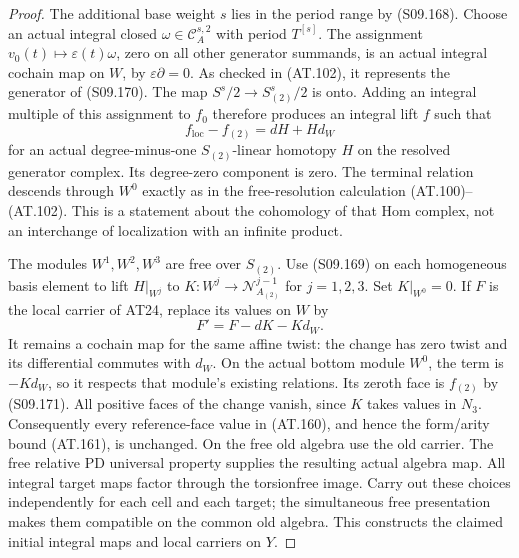 \begin{proof}
The additional base weight $s$ lies in the period range by
(S09.168). Choose an actual integral closed
$\omega\in\mathcal C_A^{s,2}$ with period $T^{[s]}$.
The assignment $v_0(t)\mapsto\varepsilon(t)\omega$, zero
on all other generator summands, is an actual integral
cochain map on $W$, by $\varepsilon\partial=0$.
As checked in (AT.102), it represents the generator of
(S09.170). The map $S^s/2\to S_{(2)}^s/2$ is onto.
Adding an integral multiple of this assignment to $f_0$
therefore produces an integral lift $f$ such that
\[
                 f_{\mathrm{loc}}-f_{(2)}=dH+Hd_W
 \tag{S09.171}
\]
for an actual degree-minus-one $S_{(2)}$-linear homotopy $H$
on the resolved generator complex. Its degree-zero component
is zero. The terminal relation descends through $W^0$ exactly
as in the free-resolution calculation (AT.100)--(AT.102).
This is a statement about the cohomology of that Hom complex,
not an interchange of localization with an infinite product.

The modules $W^1,W^2,W^3$ are free over $S_{(2)}$.
Use (S09.169) on each homogeneous basis element to lift
$H|_{W^j}$ to
$K:W^j\to\mathcal N_{A_{(2)}}^{j-1}$ for $j=1,2,3$.
Set $K|_{W^0}=0$. If $F$ is the local carrier of AT24,
replace its values on $W$ by
\[
                              F'=F-dK-Kd_W.
 \tag{S09.172}
\]
It remains a cochain map for the same affine twist: the
change has zero twist and its differential commutes with
$d_W$. On the actual bottom module $W^0$, the term is
$-Kd_W$, so it respects that module's existing relations.
Its zeroth face is $f_{(2)}$ by (S09.171).
All positive faces of the change vanish, since $K$ takes
values in $N_3$. Consequently every reference-face value
in (AT.160), and hence the form/arity bound (AT.161),
is unchanged. On the free old algebra use the old carrier.
The free relative PD universal property supplies the resulting
actual algebra map. All integral target maps factor through
the torsionfree image. Carry out these choices independently
for each cell and each target; the simultaneous free
presentation makes them compatible on the common old algebra.
This constructs the claimed initial integral maps and local
carriers on $Y$.


\end{proof}
